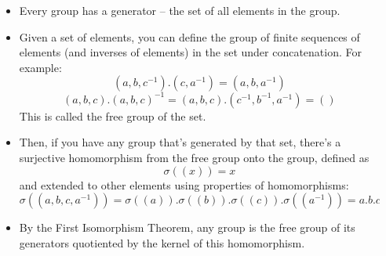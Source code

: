 \documentclass[8pt]{beamer}
\begin{document}
\begin{frame}
\begin{columns}
\begin{column}[T]{0.5\textwidth}
\begin{itemize}
        \end{itemize}
      \end{column}
      \begin{column}[T]{0.5\textwidth}
        \begin{itemize}
          \item Every group has a generator -- the set of all elements in the
            group.\pause
          \item Given a set of elements, you can define the group of finite
            sequences of elements (and inverses of elements) in the set under
            concatenation. For example:
            \[(a,b,c^{-1}). (c,a^{-1}) = (a,b,a^{-1})\]
            \[(a,b,c).(a,b,c)^{-1} = (a,b,c).(c^{-1},b^{-1},a^{-1}) = ()\]
            This is called the free group of the set.\pause
          \item
            Then, if you have any group that's generated by that set, there's a
            surjective homomorphism from the free group onto the group, defined
            as
            \[\sigma((x)) = x\]
            and extended to other elements using properties of homomorphisms:
            \[\sigma((a,b,c,a^{-1})) = \sigma((a)).\sigma((b)).\sigma((c)).
                \sigma((a^{-1})) = a.b.c.a^{-1}\]\pause
          \item By the First Isomorphism Theorem, any group is the free group of
            its generators quotiented by the kernel of this homomorphism.\pause

        \end{itemize}
      \end{column}
    \end{columns}
  \end{frame}
\end{document}

